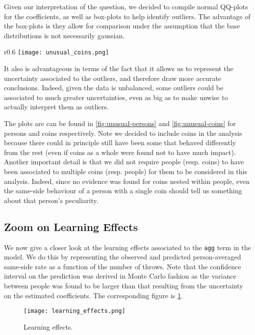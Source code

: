 \documentclass[a4paper, 12pt,oneside]{article}
\begin{document}
		Given our interpretation of the question, we decided to compile normal QQ-plots for the coefficients, as well as box-plots to help identify outliers. The advantage of the box-plots is they allow for comparison under the assumption that the base distributions is not necessarily gaussian. 
		\begin{wrapfigure}[16]{r}{0.6\textwidth}
			\vspace{-1em}
			\centering
			\texttt{[image: unusual\_coins.png]}
			\caption{Distribution inspection for estimated coin-parameters in the \texttt{1+person+coin} GLM model.}
			\label{fig:unusual-coins}
		\end{wrapfigure}
		It also is advantageous in terms of the fact that it allows us to represent the uncertainty associated to the outliers, and therefore draw more accurate conclusions. Indeed, given the data is unbalanced, some outliers could be associated to much greater uncertainties, even as big as to make unwise to actually interpret them as outliers. 
		
		The plots are can be found in \ref{fig:unusual-persons} and \ref{fig:unusual-coins} for persons and coins respectively. Note we decided to include coins in the analysis because there could in principle still have been some that behaved differently from the rest (even if coins as a whole were found not to have much impact). 
		Another important detail is that we did not require people (resp. coins) to have been associated to multiple coins (resp. people) for them to be considered in this analysis. Indeed, since no evidence was found for coins nested within people, even the same-side behaviour of a person with a single coin should tell us something about that person's peculiarity.
		\subsection{Zoom on Learning Effects}
			We now give a closer look at the learning effects associated to the \texttt{agg} term in the model. We do this by representing the observed and predicted person-averaged same-side rate as a function of the number of throws.  Note that the confidence interval on the prediction was derived in Monte Carlo fashion as the variance between people was found to be larger than that resulting from the uncertainty on the estimated coefficients. 
			The corresponding figure is \ref{fig:learning-effects}. 
			\begin{figure}[htb]
				\centering
				\texttt{[image: learning\_effects.png]}
				\caption{Learning effects.}
				\label{fig:learning-effects}
			\end{figure}
\end{document}
